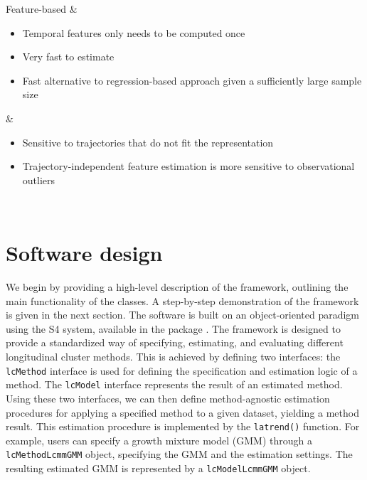 \begin{longtable}[]
Feature-based & \begin{minipage}[t]{\linewidth}\raggedright
\begin{itemize}
\tightlist
\item
  Temporal features only needs to be computed once
\item
  Very fast to estimate
\item
  Fast alternative to regression-based approach given a sufficiently large sample size \citep{denteuling2021comparison}
\end{itemize}
\end{minipage} & \begin{minipage}[t]{\linewidth}\raggedright
\begin{itemize}
\tightlist
\item
  Sensitive to trajectories that do not fit the representation
\item
  Trajectory-independent feature estimation is more sensitive to observational outliers
\end{itemize}
\end{minipage} \\
\end{longtable}

\section{Software design}\label{sec:design}

We begin by providing a high-level description of the framework, outlining the main functionality of the classes. A step-by-step demonstration of the framework is given in the next section. The software is built on an object-oriented paradigm using the S4 system, available in the  package \citep{rcoreteam2021r}. The framework is designed to provide a standardized way of specifying, estimating, and evaluating different longitudinal cluster methods. This is achieved by defining two interfaces: the \texttt{lcMethod} interface is used for defining the specification and estimation logic of a method. The \texttt{lcModel} interface represents the result of an estimated method. Using these two interfaces, we can then define method-agnostic estimation procedures for applying a specified method to a given dataset, yielding a method result. This estimation procedure is implemented by the \texttt{latrend()} function. For example, users can specify a growth mixture model (GMM) through a \texttt{lcMethodLcmmGMM} object, specifying the GMM and the estimation settings. The resulting estimated GMM is represented by a \texttt{lcModelLcmmGMM} object.


